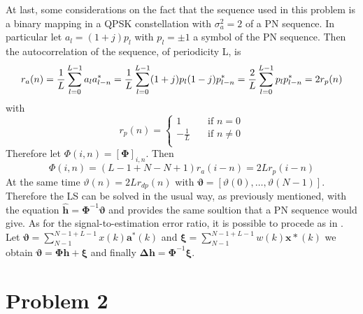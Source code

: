 \documentclass[10pt]{article}
\begin{document}
At last, some considerations on the fact that the sequence used in this problem is a binary mapping in a QPSK constellation with $\sigma_a^2 = 2$ of a PN sequence. In particular let $a_l = (1+j) p_l$ with $p_l = \pm 1$ a symbol of the PN sequence. Then the autocorrelation of the sequence, of periodicity L, is
\begin{equation}
	r_a(n) = \frac{1}{L}\sum_{l = 0}^{L-1} a_l a^*_{l-n} = \\
	\frac{1}{L}\sum_{l = 0}^{L-1} (1+j)p_l (1-j)p^*_{l-n} = 
	\frac{2}{L} \sum_{l= 0}^{L-1} p_l p^*_{l-n} = 2 r_p(n)
\end{equation}
with 
\begin{equation}
	r_p(n) = 
  	\begin{cases}
    1       & \quad \text{if } n =0 \\
    -\frac{1}{L}  & \quad \text{if } n \neq 0 \\
  \end{cases}
\end{equation}
Therefore let $\Phi(i, n) = [\mathbf{\Phi}]_{i, n}$. Then
\begin{equation}
	\Phi(i, n) = (L -1 + N - N + 1)r_a(i-n) = 2Lr_p(i-n)
\end{equation}
At the same time $\vartheta(n) = 2Lr_{dp}(n)$ with $\boldsymbol{\vartheta} = [\vartheta(0), \dots, \vartheta(N-1)]$.
Therefore the LS can be solved in the usual way, as previously mentioned, with the equation $\hat{\mathbf{h}}= \mathbf{\Phi}^{-1} \boldsymbol{\vartheta}$ and provides the same soultion that a PN sequence would give. 
As for the signal-to-estimation error ratio, it is possible to procede as in \cite{bc}. Let $\boldsymbol{\vartheta} = \sum_{N-1}^{N-1+L-1} x(k) \mathbf{a}^*(k)$ and $\boldsymbol{\xi} = \sum_{N-1}^{N-1+L-1} w(k) \mathbf{x}*(k)$ we obtain $\boldsymbol{\vartheta} = \boldsymbol{\Phi}\mathbf{h} + \boldsymbol{\xi}$ and finally $\boldsymbol{\Delta h} = \boldsymbol{\Phi}^{-1} \boldsymbol{\xi}$.

\clearpage


\section*{Problem 2}
\end{document}
